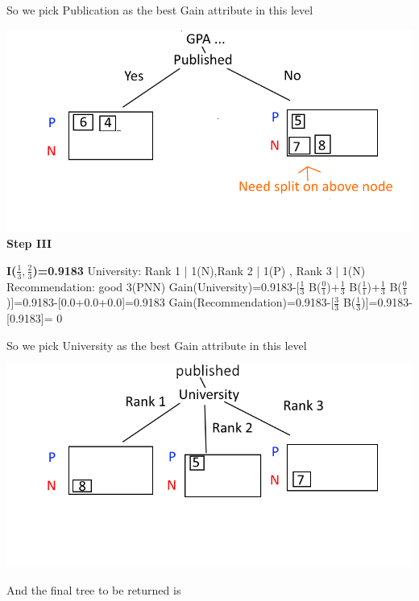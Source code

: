 \documentclass[12pt, letterpaper]{article}
\begin{document}
	So we pick Publication as the best Gain attribute in this level
	
	\includegraphics[scale=0.8]{"problem-2-step2"}
	\textbf{Step III}
	
	\textbf{I($\frac{1}{3},\frac{2}{3}$)=0.9183}\newline	
	University: Rank 1 | 1(N),Rank 2 | 1(P) , Rank 3 | 1(N)\newline
	Recommendation: good 3(PNN)\newline
	Gain(University)=0.9183-[$\frac{1}{3}$ B($\frac{0}{1}$)+$\frac{1}{3}$ B($\frac{1}{1}$)+$\frac{1}{3}$ B($\frac{0}{1}$)]=0.9183-[0.0+0.0+0.0]=0.9183\newline\newline
	Gain(Recommendation)=0.9183-[$\frac{3}{3}$ B($\frac{1}{3}$)]=0.9183-[0.9183]= 0\newline
	
	So we pick University as the best Gain attribute in this level
	
	\includegraphics[scale=0.8]{"problem-2-step3"}
	
	
	And the final tree to be returned is
	
\end{document}
